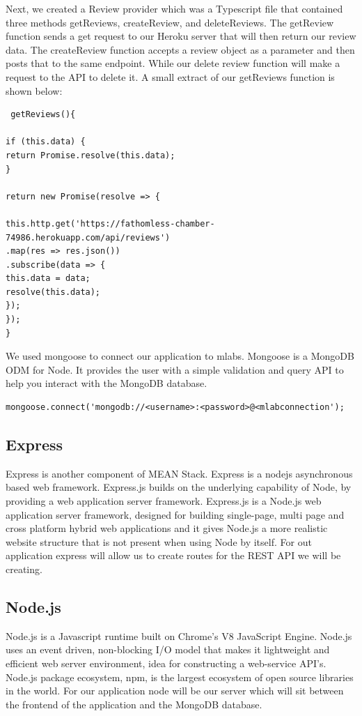 Next, we created a Review provider which was a Typescript file that contained three methods getReviews, createReview, and deleteReviews. The getReview function sends a get request to our Heroku server that will then return our review data. The createReview function accepts a review object as a parameter and then posts that to the same endpoint. While our delete review function will make a request to the API to delete it. A small extract of our getReviews function is shown below:

\begin{verbatim}
 getReviews(){

if (this.data) {
return Promise.resolve(this.data);
}

return new Promise(resolve => {

this.http.get('https://fathomless-chamber-74986.herokuapp.com/api/reviews')
.map(res => res.json())
.subscribe(data => {
this.data = data;
resolve(this.data);
});
});
}
\end{verbatim}

We used mongoose to connect our application to mlabs. Mongoose is a MongoDB ODM for Node. It provides the user with a simple validation and query API to help you interact with the MongoDB database.

\begin{verbatim}
mongoose.connect('mongodb://<username>:<password>@<mlabconnection');
\end{verbatim}

\subsection{Express}
Express is another component of MEAN Stack. Express is a nodejs asynchronous
based web framework. Express.js builds on the underlying capability of Node, by providing a web application server framework. Express.js is a Node.js web application server framework, designed for building single-page, multi page  and cross platform hybrid web applications and it gives Node.js a more realistic website structure that is not present when using Node by itself. For out application express will allow us to create routes for the REST API we will be creating.\cite{expressjs}

\subsection{Node.js}
Node.js is a Javascript runtime built on Chrome’s V8 JavaScript Engine.
Node.js uses an event driven, non-blocking I/O model that makes it lightweight
and efficient web server environment, idea for constructing a web-service
API’s. Node.js package ecosystem, npm, is the largest ecosystem of open
source libraries in the world. For our application node will be our server which will sit between the frontend of the application and the MongoDB database.\cite{nodejs}

